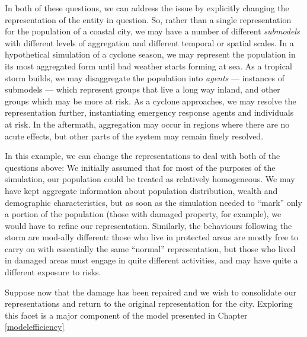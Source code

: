 In both of these questions, we can address the issue by explicitly
changing the representation of the entity in question.  So, rather
than a single representation for the population of a coastal city, we
may have a number of different \emph{submodels} with different levels
of aggregation and different temporal or spatial scales.  In a
hypothetical simulation of a cyclone season, we may represent the
population in its most aggregated form until bad weather starts
forming at sea.  As a tropical storm builds, we may dis\-aggregate the
population into \emph{agents} --- instances of submodels --- which
represent groups that live a long way inland, and other groups which
may be more at risk.  As a cyclone approaches, we may resolve the
representation further, instantiating emergency response agents and
individuals at risk.  In the aftermath, aggregation may occur in
regions where there are no acute effects, but other parts of the
system may remain finely resolved.

In this example, we can change the representations to deal with both
of the questions above: We initially assumed that for most of the
purposes of the simulation, our population could be treated as
relatively homogeneous.  We may have kept aggregate information about
population distribution, wealth and demographic characteristics, but
as soon as the simulation needed to ``mark'' only a portion of the
population (those with damaged property, for example), we would have
to refine our representation.  Similarly, the behaviours following the
storm are mod-ally different: those who live in protected areas are
mostly free to carry on with essentially the same ``normal''
representation, but those who lived in damaged areas must engage in
quite different activities, and may have quite a different exposure to
risks.

Suppose now that the damage has been repaired and we wish to
consolidate our representations and return to the original
representation for the city. Exploring this facet is a major component
of the model presented in Chapter \ref{modelefficiency}







